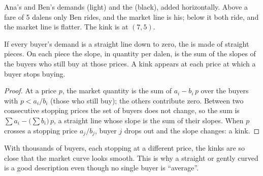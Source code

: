 \begin{omfigure}

{\small Ana's and Ben's demands (light) and the  (black), added horizontally. Above a fare of 5 dalens
only Ben rides, and the market line is his; below it both ride, and the market line is flatter. The kink is at
$(7, 5)$.}
\end{omfigure}

\begin{proposition}\label{prop:g10:demand:sum}
If every buyer's demand is a straight line down to zero, the  is made of straight pieces. On each piece
the slope, in quantity per dalen, is the sum of the slopes of the buyers who still buy at those prices. A kink appears
at each price at which a buyer stops buying.
\end{proposition}
\begin{proof}
At a price $p$, the market quantity is the sum of $a_i - b_i\,p$ over the buyers with $p < a_i/b_i$ (those who still
buy); the others contribute zero. Between two consecutive stopping prices the set of buyers does not change, so the sum
is $\sum a_i - \big(\sum b_i\big)\,p$, a straight line whose slope is the sum of their slopes. When $p$ crosses a stopping
price $a_j/b_j$, buyer $j$ drops out and the slope changes: a kink.
\end{proof}

With thousands of buyers, each stopping at a different price, the kinks are so close that the market curve looks smooth.
This is why a straight or gently curved  is a good description even though no single buyer is ``average''.

